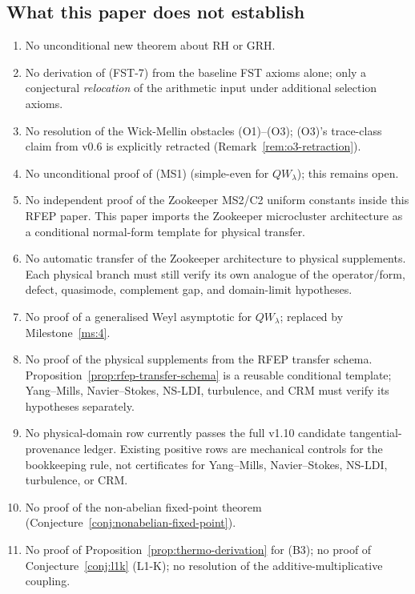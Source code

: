 \documentclass[11pt,a4paper]{article}
\theoremstyle{plain}
\theoremstyle{definition}
\begin{document}
\subsection{What this paper does not establish}

\begin{enumerate}[leftmargin=*]
\item No unconditional new theorem about RH or GRH.
\item No derivation of (FST-7) from the baseline FST axioms alone;
  only a conjectural \emph{relocation} of the arithmetic input under
  additional selection axioms.
\item No resolution of the Wick-Mellin obstacles (O1)--(O3); (O3)'s
  trace-class claim from v0.6 is explicitly retracted
  (Remark~\ref{rem:o3-retraction}).
\item No unconditional proof of (MS1) (simple-even for $QW_\lambda$);
  this remains open.
\item No independent proof of the Zookeeper MS2/C2 uniform constants
  inside this RFEP paper.  This paper imports the Zookeeper
  microcluster architecture as a conditional normal-form template for
  physical transfer.
\item No automatic transfer of the Zookeeper architecture to physical
  supplements.  Each physical branch must still verify its own
  analogue of the operator/form, defect, quasimode, complement gap,
  and domain-limit hypotheses.
\item No proof of a generalised Weyl asymptotic for $QW_\lambda$;
  replaced by Milestone~\ref{ms:4}.
\item No proof of the physical supplements from the RFEP transfer
  schema.  Proposition~\ref{prop:rfep-transfer-schema} is a reusable
  conditional template; Yang--Mills, Navier--Stokes, NS-LDI,
  turbulence, and CRM must verify its hypotheses separately.
\item No physical-domain row currently passes the full v1.10 candidate
  tangential-provenance ledger.  Existing positive rows are mechanical
  controls for the bookkeeping rule, not certificates for Yang--Mills,
  Navier--Stokes, NS-LDI, turbulence, or CRM.
\item No proof of the non-abelian fixed-point theorem
  (Conjecture~\ref{conj:nonabelian-fixed-point}).
\item No proof of Proposition~\ref{prop:thermo-derivation} for (B3);
  no proof of Conjecture~\ref{conj:l1k} (L1-K); no resolution of
  the additive-multiplicative coupling.
\end{enumerate}
\end{document}
